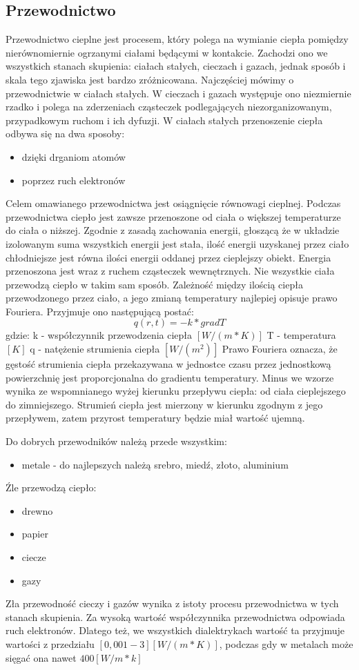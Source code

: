 \subsection {Przewodnictwo}
\label{Przewodnictwo}
 Przewodnictwo cieplne jest procesem, który polega  na wymianie ciepła 
pomiędzy nierównomiernie ogrzanymi ciałami będącymi w kontakcie. Zachodzi ono we wszystkich stanach skupienia: ciałach stałych, cieczach i gazach, jednak sposób i skala tego zjawiska jest bardzo zróżnicowana. Najczęściej mówimy o przewodnictwie w ciałach stałych.
W cieczach i gazach występuje ono niezmiernie rzadko i polega na zderzeniach cząsteczek podlegających
niezorganizowanym, przypadkowym ruchom i ich dyfuzji.
W ciałach stałych przenoszenie ciepła odbywa się  na dwa sposoby:
\begin{itemize}
\item dzięki drganiom atomów
\item poprzez ruch elektronów
\end {itemize}
Celem omawianego przewodnictwa jest 
osiągnięcie równowagi cieplnej. Podczas przewodnictwa ciepło jest zawsze przenoszone od
ciała o większej temperaturze do ciała o niższej. Zgodnie z zasadą zachowania energii, głoszącą że w układzie 
izolowanym suma wszystkich energii jest stała, ilość energii uzyskanej przez ciało chłodniejsze jest równa
ilości energii oddanej przez cieplejszy obiekt. Energia przenoszona jest wraz z ruchem cząsteczek wewnętrznych.
Nie wszystkie ciała przewodzą ciepło w takim sam sposób.
Zależność między ilością ciepła przewodzonego przez ciało, a jego zmianą temperatury najlepiej opisuje prawo Fouriera.
Przyjmuje ono następującą postać:
\begin{equation}
 q(r,t)=-k*grad T
 \label{eqn:fourier}
\end {equation}
gdzie:
k - współczynnik przewodzenia ciepła $[W / (m*K)]$
T - temperatura $[K]$
q - natężenie strumienia ciepła  $[W/(m^2)]$
Prawo Fouriera oznacza, że gęstość strumienia ciepła przekazywana w jednostce czasu przez jednostkową powierzchnię 
jest proporcjonalna do gradientu temperatury. Minus we wzorze wynika ze wspomnianego wyżej kierunku przepływu ciepła:
od ciała cieplejszego do zimniejszego. Strumień ciepła jest mierzony w kierunku zgodnym z jego przepływem, zatem przyrost
temperatury będzie miał wartość ujemną.


Do dobrych przewodników należą przede wszystkim:
\begin {itemize}
\item metale - do najlepszych należą srebro, miedź, złoto, aluminium
\end {itemize}
Źle przewodzą ciepło:
\begin {itemize}
\item drewno
\item papier
\item ciecze
\item gazy
\end {itemize}
Zła przewodność cieczy i gazów wynika z istoty procesu przewodnictwa w tych stanach skupienia. Za wysoką wartość 
współczynnika przewodnictwa odpowiada ruch elektronów. Dlatego też, we wszystkich dialektrykach wartość ta
przyjmuje wartości z przedziału $[0,001-3][W/(m*K)]$, podczas gdy w metalach może sięgać ona nawet $ 400 [W/m*k]$

